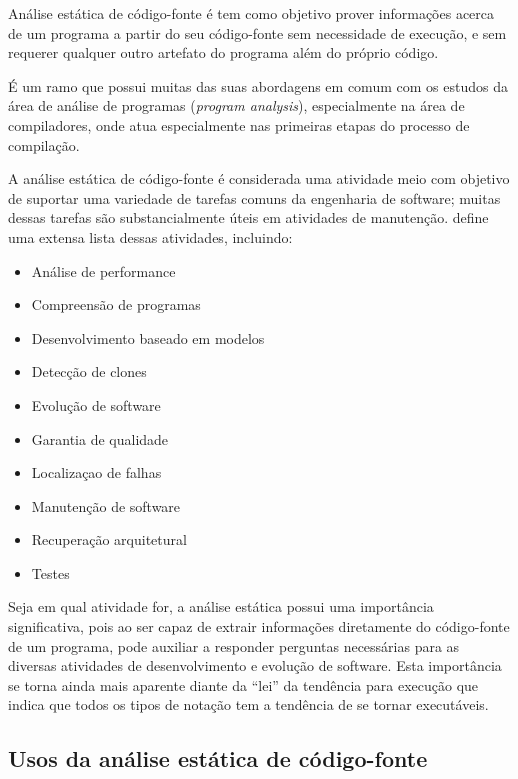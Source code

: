 Análise estática de código-fonte é tem como objetivo prover
informações acerca de um programa a partir do seu código-fonte sem
necessidade de execução, e sem requerer qualquer outro artefato do programa
além do próprio código.

É um ramo que possui muitas das suas abordagens em comum com os estudos da
área de análise de programas ({\it program analysis}), especialmente na área de
compiladores, onde atua especialmente nas primeiras etapas do processo de compilação.

A análise estática de código-fonte é considerada uma atividade meio com
objetivo de suportar uma variedade de tarefas comuns da engenharia de
software; muitas dessas tarefas são substancialmente úteis em atividades de
manutenção.  define uma extensa lista dessas
atividades, incluindo:

\begin{multicols}{2}
  \begin{itemize}
    \item Análise de performance
    \item Compreensão de programas
    \item Desenvolvimento baseado em modelos
    \item Detecção de clones
    \item Evolução de software
    \item Garantia de qualidade
    \item Localizaçao de falhas
    \item Manutenção de software
    \item Recuperação arquitetural
    \item Testes
  \end{itemize}
\end{multicols}

Seja em qual atividade for, a análise estática possui uma importância
significativa, pois ao ser capaz de extrair informações diretamente do
código-fonte de um programa, pode auxiliar a responder perguntas necessárias
para as diversas atividades de desenvolvimento e evolução de software. Esta
importância se torna ainda mais aparente diante da ``lei'' da tendência para
execução \cite{Harman2010} que indica que todos os tipos de notação tem a
tendência de se tornar executáveis.

\subsection{Usos da análise estática de código-fonte} \label{usos}

